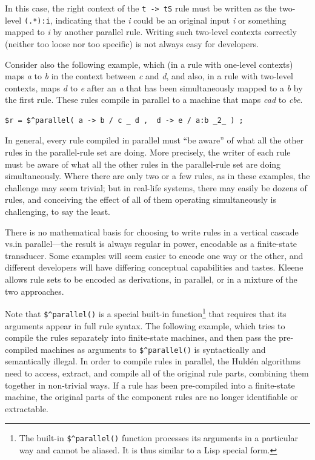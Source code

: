 \noindent
In this case, the right context of the \texttt{t -> tS} rule must be written as the
two-level \texttt{(.*):i}, indicating that the \emph{i} could be an original input
\emph{i} or something mapped to \emph{i} by another parallel rule.  Writing such two-level
contexts correctly (neither too loose nor too specific) is not always easy for
developers. 

Consider also the following example, which (in a rule with one-level contexts) maps
\emph{a} to \emph{b} in the context between \emph{c} and
\emph{d}, and also, in a rule with two-level contexts, maps \emph{d} to \emph{e} after an
\emph{a} that has been simultaneously mapped to a \emph{b} by the first rule.  These rules compile
in parallel to a machine that maps \emph{cad} to \emph{cbe}.

\begin{Verbatim}
$r = $^parallel( a -> b / c _ d ,  d -> e / a:b _2_ ) ;
\end{Verbatim}

In general, every rule compiled in parallel must ``be aware'' of what all the other rules
in the parallel-rule set are doing.  More precisely, the writer of each rule must be aware of
what all the other rules in the parallel-rule set are doing
simultaneously.  Where there are only two or a few rules,
as in these examples, the challenge may seem trivial; but in real-life systems, there may
easily be
dozens of rules, and conceiving the effect of all of them operating simultaneously is
challenging, to say the least.

There is no mathematical basis for choosing to write rules in a vertical cascade vs.\@ in
parallel---the result is always regular in power, encodable as a finite-state transducer.
Some examples will seem easier to encode one way or the other, and different developers
will have differing conceptual capabilities and tastes.  Kleene allows rule sets to be
encoded as derivations, in parallel, or in a mixture of the two approaches.

Note that \verb!$^parallel()! is a special built-in
function\footnote{The built-in \verb!$^parallel()! function processes its arguments in a particular way and
cannot be aliased.  It is thus similar to a Lisp special form.}  that requires that its
arguments appear in full rule syntax.  The following example, which tries to compile the
rules separately into finite-state machines, and then pass the
pre-compiled machines as arguments to
\verb!$^parallel()! is syntactically and semantically illegal.  In order to compile
rules in parallel, the Huld\'en algorithms need to access, extract, and compile all of the
original rule parts, combining them together in non-trivial ways.  If a rule has been
pre-compiled into a finite-state machine, the original parts of the component rules are
no longer identifiable or extractable.

